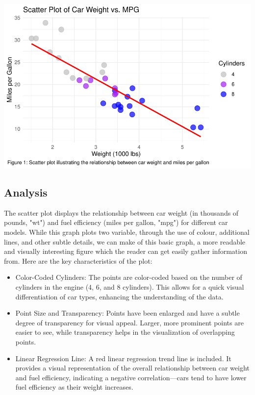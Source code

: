 \documentclass{article}\usepackage[]{graphicx}\usepackage[]{xcolor}
\makeatletter
\def\maxwidth{ %
  \ifdim\Gin@nat@width>\linewidth
    \linewidth
  \else
    \Gin@nat@width
  \fi
}
\newenvironment{kframe}{%
 \def\at@end@of@kframe{}%
 \ifinner\ifhmode%
  \def\at@end@of@kframe{\end{minipage}}%
  \begin{minipage}{\columnwidth}%
 \fi\fi%
 \def\FrameCommand##1{\hskip\@totalleftmargin \hskip-\fboxsep
 \colorbox{shadecolor}{##1}\hskip-\fboxsep
     \hskip-\linewidth \hskip-\@totalleftmargin \hskip\columnwidth}%
 \MakeFramed {\advance\hsize-\width
   \@totalleftmargin\z@ \linewidth\hsize
   \@setminipage}}%
 {\par\unskip\endMakeFramed%
 \at@end@of@kframe}
\newenvironment{knitrout}{}{} %
\makeatother
\begin{document}
\begin{knitrout}
\color{fgcolor}\begin{kframe}


{\ttfamily\noindent\itshape{}}\end{kframe}
\includegraphics[width=\maxwidth]{figure/scatter-plot-chunk-1} 
\end{knitrout}

\subsection{Analysis}
The scatter plot displays the relationship between car weight (in thousands of pounds, "wt") and fuel efficiency (miles per gallon, "mpg") for different car models. While this graph plots two variable, through the use of colour, additional lines, and other subtle details, we can make of this basic graph, a more readable and visually interesting figure which the reader can get easily gather information from. Here are the key characteristics of the plot:
\begin{itemize}
    \item Color-Coded Cylinders: The points are color-coded based on the number of cylinders in the engine (4, 6, and 8 cylinders). This allows for a quick visual differentiation of car types, enhancing the understanding of the data.
    \item Point Size and Transparency: Points have been enlarged and have a subtle degree of transparency for visual appeal. Larger, more prominent points are easier to see, while transparency helps in the visualization of overlapping points.
    \item Linear Regression Line: A red linear regression trend line is included. It provides a visual representation of the overall relationship between car weight and fuel efficiency, indicating a negative correlation—cars tend to have lower fuel efficiency as their weight increases.\\
\end{itemize}
\end{document}
